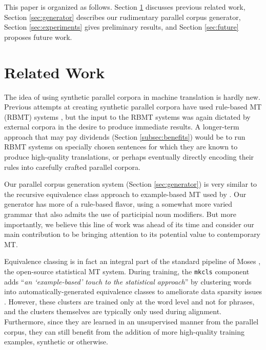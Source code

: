 This paper is organized as follows.
Section \ref{sec:related} discusses previous related work,
Section \ref{sec:generator} describes our rudimentary parallel corpus generator,
Section \ref{sec:experiments} gives preliminary results, 
and Section \ref{sec:future} proposes future work.



\section{Related Work}
\label{sec:related}

The idea of using synthetic parallel corpora in machine translation is hardly new.
Previous attempts at creating synthetic parallel corpora have used rule-based MT (RBMT) systems , but the input to the RBMT systems was again dictated by external corpora in the desire to produce immediate results.
A longer-term approach that may pay dividends (Section \ref{subsec:benefits}) would be to run RBMT systems on specially chosen sentences for which they are known to produce high-quality translations, or perhaps eventually directly encoding their rules into carefully crafted parallel corpora.

Our parallel corpus generation system (Section \ref{sec:generator}) is very similar to the recursive equivalence class approach to example-based MT  used by . 
Our generator has more of a rule-based flavor, using a somewhat more varied grammar that also admits the use of participial noun modifiers.
But more importantly, we believe this line of work was ahead of its time and consider our main contribution to be bringing attention to its potential value to contemporary MT.  

Equivalence classing is in fact an integral part of the standard pipeline of Moses , the open-source statistical MT system. 
During training, the {\small \tt mkcls} component adds ``{\em an `example-based' touch to the statistical approach}'' by clustering words into automatically-generated equivalence classes to ameliorate data sparsity issues .
However, these clusters are trained only at the word level and not for phrases, and the clusters themselves are typically only used during alignment.
Furthermore, since they are learned in an unsupervised manner from the parallel corpus, they can still benefit from the addition of more high-quality training examples, synthetic or otherwise.

